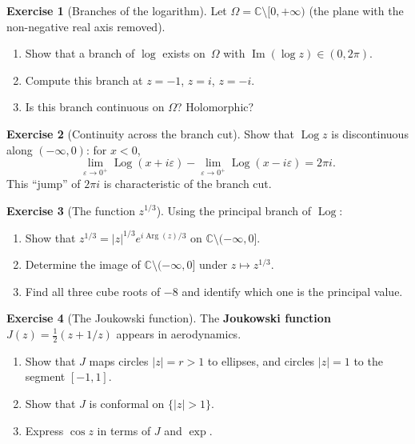 \documentclass[12pt,a4paper,openany]{book}
\theoremstyle{definition}
\newtheorem{exercise}{Exercise}[chapter]
\theoremstyle{plain}
\theoremstyle{remark}
\newcommand{\C}{\mathbb{C}}
\DeclareMathOperator{\im}{Im}
\DeclareMathOperator{\Arg}{Arg}
\DeclareMathOperator{\Log}{Log}
\newcommand{\abs}[1]{\left|#1\right|}
\begin{document}
\begin{exercise}[Branches of the logarithm]\label{exo:log-branches}
Let $\Omega = \C\setminus[0,+\infty)$ (the plane with the non-negative real
axis removed).
\begin{enumerate}[label=\textup{(\alph*)}]
  \item Show that a branch of $\log$ exists on~$\Omega$ with
    $\im(\log z)\in(0,2\pi)$.
  \item Compute this branch at $z=-1$, $z=i$, $z=-i$.
  \item Is this branch continuous on $\Omega$?  Holomorphic?
\end{enumerate}
\end{exercise}

\begin{exercise}[Continuity across the branch cut]\label{exo:branch-cut-continuity}
Show that $\Log z$ is discontinuous along $(-\infty,0)$: for $x<0$,
\[
  \lim_{\varepsilon\to 0^+}\Log(x+i\varepsilon) -
  \lim_{\varepsilon\to 0^+}\Log(x-i\varepsilon) = 2\pi i.
\]
This ``jump'' of $2\pi i$ is characteristic of the branch cut.
\end{exercise}

\begin{exercise}[The function $z^{1/3}$]\label{exo:cube-root}
Using the principal branch of $\Log$:
\begin{enumerate}[label=\textup{(\alph*)}]
  \item Show that $z^{1/3} = \abs{z}^{1/3}e^{i\Arg(z)/3}$ on
    $\C\setminus(-\infty,0]$.
  \item Determine the image of $\C\setminus(-\infty,0]$ under $z\mapsto z^{1/3}$.
  \item Find all three cube roots of $-8$ and identify which one is
    the principal value.
\end{enumerate}
\end{exercise}

\begin{exercise}[The Joukowski function]\label{exo:joukowski}
The \textbf{Joukowski function} $J(z) = \frac{1}{2}(z+1/z)$ appears in
aerodynamics.
\begin{enumerate}[label=\textup{(\alph*)}]
  \item Show that $J$ maps circles $\abs{z}=r>1$ to ellipses, and circles
    $\abs{z}=1$ to the segment $[-1,1]$.
  \item Show that $J$ is conformal on $\{\abs{z}>1\}$.
  \item Express $\cos z$ in terms of $J$ and $\exp$.
\end{enumerate}
\end{exercise}
\end{document}
